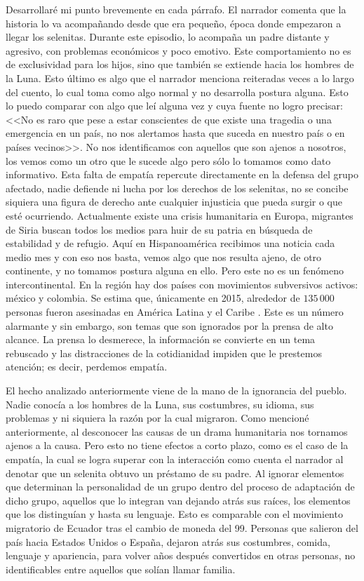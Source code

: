 \documentclass[a3paper]{tufte-handout}
\begin{document}
Desarrollaré mi punto brevemente en cada párrafo. El narrador comenta que la historia lo va acompañando desde que era pequeño, época donde empezaron a llegar los selenitas. Durante este episodio, lo acompaña un padre distante y agresivo, con problemas económicos y poco emotivo. Este comportamiento no es de exclusividad para los hijos, sino que también se extiende hacia los hombres de la Luna. Esto último es algo que el narrador menciona reiteradas veces a lo largo del cuento, lo cual toma como algo normal y no desarrolla postura alguna. Esto lo puedo comparar con algo que leí alguna vez y cuya fuente no logro precisar: <<No es raro que pese a estar conscientes de que existe una tragedia o una emergencia en un país, no nos alertamos hasta que suceda en nuestro país o en países vecinos>>. No nos identificamos con aquellos que son ajenos a nosotros, los vemos como un otro que le sucede algo pero sólo lo tomamos como dato informativo. Esta falta de empatía repercute directamente en la defensa del grupo afectado, nadie defiende ni lucha por los derechos de los selenitas, no se concibe siquiera una figura de derecho ante cualquier injusticia que pueda surgir o que esté ocurriendo. Actualmente existe una crisis humanitaria en Europa, migrantes de Siria buscan todos los medios para huir de su patria en búsqueda de estabilidad y de refugio. Aquí en Hispanoamérica recibimos una noticia cada medio mes y con eso nos basta, vemos algo que nos resulta ajeno, de otro continente, y no tomamos postura alguna en ello. Pero este no es un fenómeno intercontinental. En la región hay dos países con movimientos subversivos activos: méxico y colombia. Se estima que, únicamente en 2015, alrededor de \(135\, 000\) personas fueron asesinadas en América Latina y el Caribe \citep{Ruben}.
Este es un número alarmante y sin embargo, son temas que son ignorados por la prensa de alto alcance. La prensa lo desmerece, la información se convierte en un tema rebuscado y las distracciones de la cotidianidad impiden que le prestemos atención; es decir, perdemos empatía.

El hecho analizado anteriormente viene de la mano de la ignorancia del pueblo. Nadie conocía a los hombres de la Luna, sus costumbres, su idioma, sus problemas y ni siquiera la razón por la cual migraron. Como mencioné anteriormente, al desconocer las causas de un drama humanitaria nos tornamos ajenos a la causa. Pero esto no tiene efectos a corto plazo, como es el caso de la empatía, la cual se logra superar con la interacción como cuenta el narrador al denotar que un selenita obtuvo un préstamo de su padre. Al ignorar elementos que determinan la personalidad de un grupo dentro del proceso de adaptación de dicho grupo, aquellos que lo integran van dejando atrás sus raíces, los elementos que los distinguían y hasta su lenguaje. Esto es comparable con el movimiento migratorio de Ecuador tras el cambio de moneda del 99. Personas que salieron del país hacia Estados Unidos o España, dejaron atrás sus costumbres, comida, lenguaje y apariencia, para volver años después convertidos en otras personas, no identificables entre aquellos que solían llamar familia. 
\end{document}
